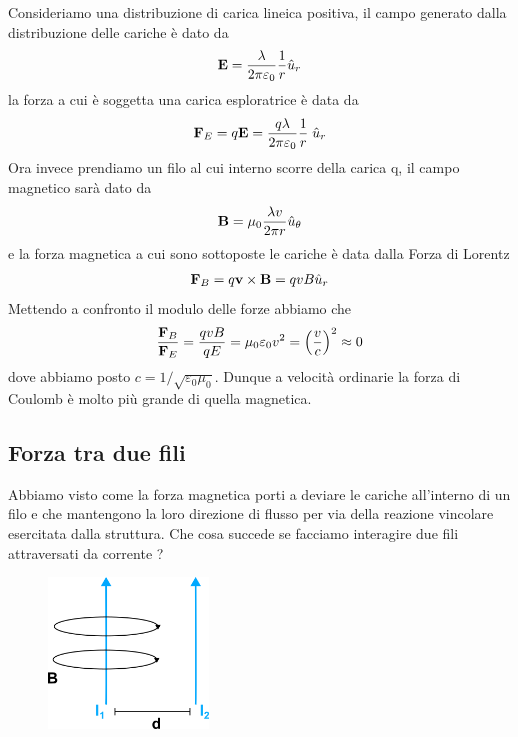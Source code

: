 Consideriamo una distribuzione di carica lineica positiva, il campo generato dalla distribuzione delle cariche \`e dato da 
\begin{equation*}
	\bold{E} = \frac{\lambda }{2 \pi \varepsilon_0}\frac{1}{r} \hat{u}_{r}
\end{equation*}
la forza a cui \`e soggetta una carica esploratrice \`e data da 
\begin{equation*}
	\bold{F}_{E} = q\bold{E} = \frac{q\lambda}{2 \pi \varepsilon_0}\frac{1}{r}\;\hat{u}_{r}
\end{equation*}
Ora invece prendiamo un filo al cui interno scorre della carica q, il campo magnetico sar\`a dato da 
\begin{equation*}
	\bold{B} = \mu_0 \frac{\lambda v}{2 \pi r}\hat{u}_{\theta}
\end{equation*}
e la forza magnetica a cui sono sottoposte le cariche \`e data dalla Forza di Lorentz
\begin{equation*}
	\bold{F}_{B} = q \bold{v} \times \bold{B} = qvB \hat{u}_{r}
\end{equation*}
Mettendo a confronto il modulo delle forze abbiamo che 
\begin{equation*}
	\frac{\bold{F}_B}{\bold{F}_E} = \frac{qvB}{qE} = \mu_0 \varepsilon_0 v^2 = \left (\frac{v}{c}\right)^2\approx 0
\end{equation*}
dove abbiamo posto $c = 1/\sqrt{\varepsilon_0\mu_0}$. Dunque a velocit\`a ordinarie la forza di Coulomb \`e molto pi\`u grande di quella  magnetica.

\subsection{Forza tra due fili}

Abbiamo visto come la forza magnetica porti a deviare le cariche all'interno di un filo e che mantengono la loro direzione di flusso per via della reazione vincolare esercitata dalla struttura. Che cosa succede se facciamo interagire due fili attraversati da corrente ?
\begin{figure} %
    \centering
    \includegraphics[width=0.38\textwidth]{images/doublewire} %
\end{figure}

